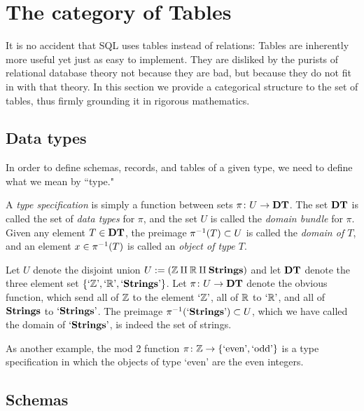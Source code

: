 \documentclass{amsart}
\def\DT{{\bf DT}}
\def\Strings{{\bf Strings}}
\def\'{\tn{'}}
\def\'{\tn{'}}
\begin{document}
\section{The category of Tables}\label{sec:tables}

It is no accident that SQL uses tables instead of relations: Tables are inherently more useful yet just as easy to implement.  They are disliked by the purists of relational database theory not because they are bad, but because they do not fit in with that theory.  In this section we provide a categorical structure to the set of tables, thus firmly grounding it in rigorous mathematics.  

\subsection{Data types}

In order to define schemas, records, and tables of a given type, we need to define what we mean by ``type." 

\begin{definition}

A {\em type specification} is simply a function between sets $\pi\taking U\to \DT$.  The set $\DT$ is called the set of {\em data types} for $\pi$, and the set $U$ is called the {\em domain bundle} for $\pi$.  Given any element $T\in\DT$, the preimage $\pi^\m1(T)\ss U$ is called the {\em domain of $T$}, and an element $x\in\pi^\m1(T)$ is called an {\em object of type $T$}.

\end{definition}

\begin{example}\label{ex:type specification}

Let $U$ denote the disjoint union $U:=(\ZZ\amalg\RR\amalg\Strings)$ and let $\DT$ denote the three element set $\{`\ZZ\', `\RR\', `\Strings\'\}$.  Let $\pi\taking U\to\DT$ denote the obvious function, which send all of ${\mathbb Z}$ to the element $`\ZZ\'$, all of ${\mathbb R}$ to $`\RR\'$, and all of $\Strings$ to $`\Strings\'$. 
The preimage $\pi^\m1(`\Strings\')\ss U$, which we have called the domain of $`\Strings\'$, is indeed the set of strings.

As another example, the mod 2 function $\pi\colon{\mathbb Z}\rightarrow\{\textnormal{`even'},\textnormal{`odd'}\}$ is a type specification in which the objects of type `even' are the even integers.

\end{example}

\subsection{Schemas}
\end{document}
